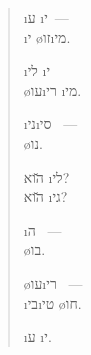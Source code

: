 
\begin{verse}
	 \i{ע} \i{י}~—\\
	\i{י} \o{זו}\i{מי}.

	\i{לי}  \i{י}\\
	\o{עו}\i{רי} \i{מי}.

	\i{ני}\i{סי} ~—\\
	 \o{נו}.

	 \u{הוא} \i{לי}?\\
	 \u{הוא} \i{גי}?

	\i{ה}  ~—\\
	 \o{בו}.

	\o{עו}\i{רי} ~—\\
	\i{בי}\i{טי} \o{חו}.

	 \i{ע} \i{י}.
\end{verse}
